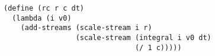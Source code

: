 \documentclass[a4paper,12pt]{article}
\begin{document}
\begin{lstlisting}
(define (rc r c dt)
  (lambda (i v0)
    (add-streams (scale-stream i r)
                 (scale-stream (integral i v0 dt)
                               (/ 1 c)))))
\end{lstlisting}
\end{document}
